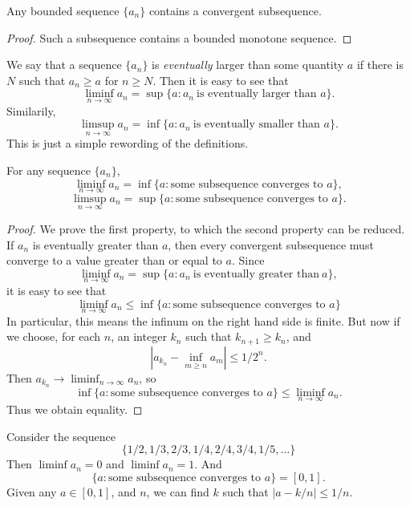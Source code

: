 \begin{corollary}
    Any bounded sequence $\{ a_n \}$ contains a convergent subsequence.
\end{corollary}
\begin{proof}
    Such a subsequence contains a bounded monotone sequence.
\end{proof}

We say that a sequence $\{ a_n \}$ is \emph{eventually} larger than some quantity $a$ if there is $N$ such that $a_n \geq a$ for $n \geq N$. Then it is easy to see that
%
\[ \liminf_{n \to \infty} a_n = \sup \{ a : a_n\ \text{is eventually larger than $a$} \}. \]
%
Similarily,
%
\[ \limsup_{n \to \infty} a_n = \inf \{ a : a_n\ \text{is eventually smaller than $a$} \}. \]
%
This is just a simple rewording of the definitions.

\begin{corollary}
    For any sequence $\{ a_n \}$,
    \[ \liminf_{n \to \infty} a_n = \inf \{ a : \text{some subsequence converges to $a$} \}, \]
    \[ \limsup_{n \to \infty} a_n = \sup \{ a : \text{some subsequence converges to $a$} \}. \]
\end{corollary}
\begin{proof}
    We prove the first property, to which the second property can be reduced. If $a_n$ is eventually greater than $a$, then every convergent subsequence must converge to a value greater than or equal to $a$. Since
    \[ \liminf_{n \to \infty} a_n = \sup \{ a : a_n\ \text{is eventually greater than}\ a \}, \]
    it is easy to see that
    \[ \liminf_{n \to \infty} a_n \leq \inf \{ a : \text{some subsequence converges to $a$} \} \]
    In particular, this means the infinum on the right hand side is finite. But now if we choose, for each $n$, an integer $k_n$ such that $k_{n+1} \geq k_n$, and
    \[ | a_{k_n} - \inf_{m \geq n} a_m| \leq 1/2^n. \]
    Then $a_{k_n} \to \liminf_{n \to \infty} a_n$, so
    \[ \inf \{ a : \text{some subsequence converges to $a$} \} \leq \liminf_{n \to \infty} a_n. \]
    Thus we obtain equality.
\end{proof}

\begin{example}
    Consider the sequence
    \[ \{ 1/2, 1/3, 2/3, 1/4, 2/4, 3/4, 1/5, \dots \} \]
    Then $\liminf a_n = 0$ and $\liminf a_n = 1$. And
    \[ \{ a : \text{some subsequence converges to $a$} \} = [0,1]. \]
    Given any $a \in [0,1]$, and $n$, we can find $k$ such that $|a - k/n| \leq 1/n$.
\end{example}

